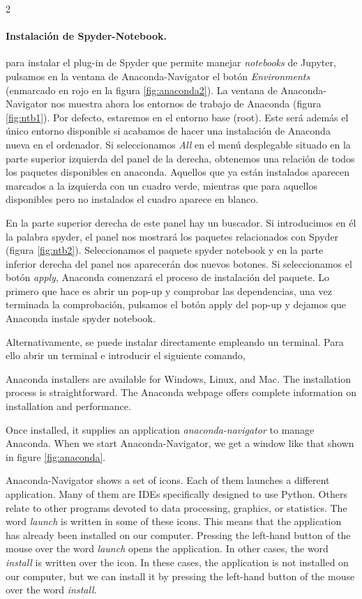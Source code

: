 \begin{paracol}{2}
 \paragraph{Instalación de Spyder-Notebook.} para instalar el plug-in de Spyder que permite manejar \emph{notebooks} de Jupyter, pulsamos en la ventana de Anaconda-Navigator el botón \emph{Environments} (enmarcado en rojo en la figura \ref{fig:anaconda2}). La ventana de Anaconda-Navigator nos muestra ahora los entornos de trabajo de Anaconda (figura \ref{fig:ntb1}). Por defecto, estaremos en el entorno base (root). Este será además el único entorno disponible si acabamos de hacer una instalación de Anaconda nueva en el ordenador. Si seleccionamos \emph{All} en el menú desplegable situado en la parte superior izquierda del panel de la derecha,  obtenemos una relación de todos los paquetes disponibles en anaconda. Aquellos que ya están instalados aparecen marcados a la izquierda con un cuadro verde, mientras que para aquellos disponibles pero no instalados el cuadro aparece en blanco.

 En la parte superior derecha de este panel hay un buscador. Si introducimos en él la palabra spyder, el panel nos mostrará los paquetes relacionados con Spyder (figura \ref{fig:ntb2}). Seleccionamos el paquete spyder notebook y en la parte inferior derecha del panel nos aparecerán dos nuevos botones. Si seleccionamos el botón \emph{apply}, Anaconda comenzará el proceso de instalación del paquete. Lo primero que hace es abrir un pop-up y comprobar las dependencias, una vez terminada la comprobación, pulsamos el botón apply del pop-up y dejamos que Anaconda instale spyder notebook.
 
 Alternativamente, se puede instalar directamente empleando un terminal. Para ello abrir un terminal e introducir el siguiente comando,
 
 

 \switchcolumn
 Anaconda installers are available for Windows, Linux, and Mac. The installation process is straightforward. The Anaconda webpage offers complete information on installation and performance.

 Once installed, it supplies an application \emph{anaconda-navigator} to manage Anaconda. When we start Anaconda-Navigator, we get a window like that shown in figure \ref{fig:anaconda}.

 Anaconda-Navigator shows a set of icons. Each of them launches a different application. Many of them are IDEs specifically designed to use Python. Others relate to other programs devoted to data processing, graphics, or statistics. The word \emph{launch} is written in some of these icons. This means that the application has already been installed on our computer. Pressing the left-hand button of the mouse over the word \emph{launch} opens the application. In other cases, the word \emph{install} is written over the icon. In these cases, the application is not installed on our computer, but we can install it by pressing the left-hand button of the mouse over the word \emph{install}.


\end{paracol}
